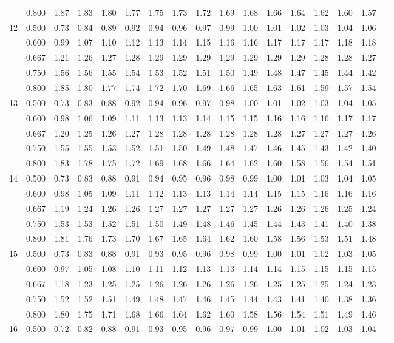 {\begin{center}
\begin{tabular}{rrr@{\,}r@{\,}r@{\,}r@{\,}r@{\,}r@{\,}r@{\,}r
                   @{\,}r@{\,}r@{\,}r@{\,}r@{\,}r@{\,}r@{\,}r}
  &0.800&1.87&1.83&1.80&1.77&1.75&1.73&1.72&1.69&1.68&1.66&1.64&1.62&1.60&1.57\\
12&0.500&0.73&0.84&0.89&0.92&0.94&0.96&0.97&0.99&1.00&1.01&1.02&1.03&1.04&1.06\\
  &0.600&0.99&1.07&1.10&1.12&1.13&1.14&1.15&1.16&1.16&1.17&1.17&1.17&1.18&1.18\\
  &0.667&1.21&1.26&1.27&1.28&1.29&1.29&1.29&1.29&1.29&1.29&1.29&1.28&1.28&1.27\\
  &0.750&1.56&1.56&1.55&1.54&1.53&1.52&1.51&1.50&1.49&1.48&1.47&1.45&1.44&1.42\\
  &0.800&1.85&1.80&1.77&1.74&1.72&1.70&1.69&1.66&1.65&1.63&1.61&1.59&1.57&1.54\\
13&0.500&0.73&0.83&0.88&0.92&0.94&0.96&0.97&0.98&1.00&1.01&1.02&1.03&1.04&1.05\\
  &0.600&0.98&1.06&1.09&1.11&1.13&1.13&1.14&1.15&1.15&1.16&1.16&1.16&1.17&1.17\\
  &0.667&1.20&1.25&1.26&1.27&1.28&1.28&1.28&1.28&1.28&1.28&1.27&1.27&1.27&1.26\\
  &0.750&1.55&1.55&1.53&1.52&1.51&1.50&1.49&1.48&1.47&1.46&1.45&1.43&1.42&1.40\\
  &0.800&1.83&1.78&1.75&1.72&1.69&1.68&1.66&1.64&1.62&1.60&1.58&1.56&1.54&1.51\\
14&0.500&0.73&0.83&0.88&0.91&0.94&0.95&0.96&0.98&0.99&1.00&1.01&1.03&1.04&1.05\\
  &0.600&0.98&1.05&1.09&1.11&1.12&1.13&1.13&1.14&1.14&1.15&1.15&1.16&1.16&1.16\\
  &0.667&1.19&1.24&1.26&1.26&1.27&1.27&1.27&1.27&1.27&1.26&1.26&1.26&1.25&1.24\\
  &0.750&1.53&1.53&1.52&1.51&1.50&1.49&1.48&1.46&1.45&1.44&1.43&1.41&1.40&1.38\\
  &0.800&1.81&1.76&1.73&1.70&1.67&1.65&1.64&1.62&1.60&1.58&1.56&1.53&1.51&1.48\\
15&0.500&0.73&0.83&0.88&0.91&0.93&0.95&0.96&0.98&0.99&1.00&1.01&1.02&1.03&1.05\\
  &0.600&0.97&1.05&1.08&1.10&1.11&1.12&1.13&1.13&1.14&1.14&1.15&1.15&1.15&1.15\\
  &0.667&1.18&1.23&1.25&1.25&1.26&1.26&1.26&1.26&1.26&1.25&1.25&1.25&1.24&1.23\\
  &0.750&1.52&1.52&1.51&1.49&1.48&1.47&1.46&1.45&1.44&1.43&1.41&1.40&1.38&1.36\\
  &0.800&1.80&1.75&1.71&1.68&1.66&1.64&1.62&1.60&1.58&1.56&1.54&1.51&1.49&1.46\\
16&0.500&0.72&0.82&0.88&0.91&0.93&0.95&0.96&0.97&0.99&1.00&1.01&1.02&1.03&1.04\\

\end{tabular}
\end{center}}
